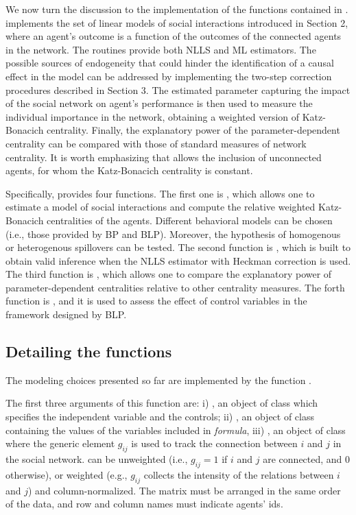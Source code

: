 \documentclass[nojss]{jss}
\begin{document}
	We now turn the discussion to the implementation of the functions contained in .  implements the set of linear models of social interactions introduced in Section 2, where an agent's outcome is a function of the outcomes of the connected agents in the network. The routines provide both NLLS and ML estimators. The possible sources of endogeneity that could hinder the identification of a causal effect in the model can be addressed by implementing the two-step
	correction procedures described in Section 3. The estimated parameter capturing the impact of the social network on agent's performance is then used to measure the individual importance in the network, obtaining a weighted version of Katz-Bonacich centrality. Finally, the explanatory power of the parameter-dependent centrality can be compared with those of standard measures of network centrality. It is worth emphasizing that  allows the inclusion of unconnected agents, for whom the Katz-Bonacich centrality is constant.
	
	Specifically,  provides four functions. The first one is , which allows one to estimate a model of social interactions and compute the relative weighted Katz-Bonacich centralities of the agents. Different behavioral models can be chosen (i.e., those provided by BP and BLP). Moreover, the hypothesis of homogenous or heterogenous spillovers can be tested. The second function is , which is built to obtain valid inference when the NLLS estimator with Heckman correction is used. The third function is , which allows one to compare the explanatory power of parameter-dependent centralities relative to other centrality measures. The forth function is , and it is used to assess the effect of control variables in the framework designed by BLP.
	
	\subsection{Detailing the functions}
	The modeling choices presented so far are implemented by the function .
	
	The first three arguments of this function are: i) , an object of class  which specifies the independent variable and the controls; ii) , an object of class  containing the values of the variables included in \textit{formula}, iii) , an object of class  where the generic element $g_{ij}$ is used to track the connection between $i$ and $j$ in the social network.  can be unweighted (i.e., $g_{ij}=1$ if $i$ and $j$ are connected, and 0 otherwise), or weighted (e.g., $g_{ij}$ collects the intensity of the relations between $i$ and $j$) and column-normalized. The matrix must be arranged in the same order of the data, and row and column names must indicate agents' ids.
	
\end{document}
